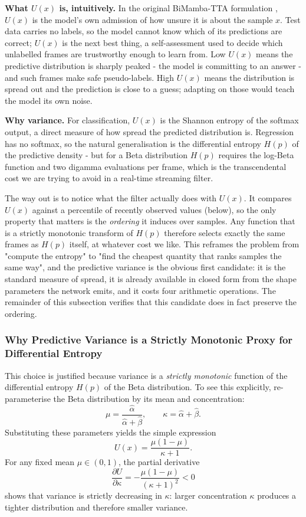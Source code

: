 \documentclass[11pt,a4paper]{article}
\begin{document}
	\textbf{What $U(x)$ is, intuitively.} In the original BiMamba-TTA formulation \cite{ziyu2025}, $U(x)$ is the model's own admission of how unsure it is about the sample $x$. Test data carries no labels, so the model cannot know which of its predictions are correct; $U(x)$ is the next best thing, a self-assessment used to decide which unlabelled frames are trustworthy enough to learn from. Low $U(x)$ means the predictive distribution is sharply peaked - the model is committing to an answer - and such frames make safe pseudo-labels. High $U(x)$ means the distribution is spread out and the prediction is close to a guess; adapting on those would teach the model its own noise.

	\textbf{Why variance.} For classification, $U(x)$ is the Shannon entropy of the softmax output, a direct measure of how spread the predicted distribution is. Regression has no softmax, so the natural generalisation is the differential entropy $H(p)$ of the predictive density - but for a Beta distribution $H(p)$ requires the log-Beta function and two digamma evaluations per frame, which is the transcendental cost we are trying to avoid in a real-time streaming filter. 

	The way out is to notice what the filter actually does with $U(x)$. It compares $U(x)$ against a percentile of recently observed values (below), so the only property that matters is the \emph{ordering} it induces over samples. Any function that is a strictly monotonic transform of $H(p)$ therefore selects exactly the same frames as $H(p)$ itself, at whatever cost we like. This reframes the problem from "compute the entropy" to "find the cheapest quantity that ranks samples the same way", and the predictive variance is the obvious first candidate: it is the standard measure of spread, it is already available in closed form from the shape parameters the network emits, and it costs four arithmetic operations. The remainder of this subsection verifies that this candidate does in fact preserve the ordering.

	\subsubsection{Why Predictive Variance is a Strictly Monotonic Proxy for Differential Entropy}
	
	This choice is justified because variance is a \emph{strictly monotonic} function of the differential entropy $H(p)$ of the Beta distribution.  
	To see this explicitly, re-parameterise the Beta distribution by its mean and concentration:
	$$
	\mu = \frac{\hat{\alpha}}{\hat{\alpha}+\hat{\beta}}, \qquad \kappa = \hat{\alpha} + \hat{\beta}.
	$$
	Substituting these parameters yields the simple expression
	$$
	U(x) = \frac{\mu(1-\mu)}{\kappa + 1}.
	$$
	For any fixed mean $\mu \in (0,1)$, the partial derivative
	$$
	\frac{\partial U}{\partial \kappa} = -\frac{\mu(1-\mu)}{(\kappa+1)^2} < 0
	$$
	shows that variance is strictly decreasing in $\kappa$: larger concentration $\kappa$ produces a tighter distribution and therefore smaller variance.
	
\end{document}
